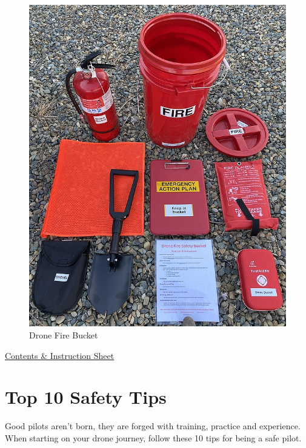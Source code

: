 \documentclass[
  12pt,
]{book}
\begin{document}
\begin{figure}

{\centering \includegraphics[width=0.75\linewidth]{images/DroneFireBucket} 

}

\caption{Drone Fire Bucket}\label{fig:fire-bucket}
\end{figure}

\href{https://ucdrones.github.io/library/drone_fire_safety_bucket.docx}{Contents \& Instruction Sheet}

\section{Top 10 Safety Tips}\label{tips}

Good pilots aren't born, they are forged with training, practice and experience. When starting on your drone journey, follow these 10 tips for being a safe pilot.
\end{document}
